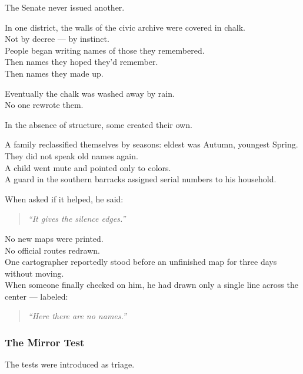 \documentclass[12pt]{article}
\begin{document}
The Senate never issued another.

\vspace{1em}

In one district, the walls of the civic archive were covered in chalk.\\
Not by decree — by instinct.\\
People began writing names of those they remembered.\\
Then names they hoped they’d remember.\\
Then names they made up.

Eventually the chalk was washed away by rain.\\
No one rewrote them.

\vspace{1em}

In the absence of structure, some created their own.

A family reclassified themselves by seasons: eldest was Autumn, youngest Spring.\\
They did not speak old names again.\\
A child went mute and pointed only to colors.\\
A guard in the southern barracks assigned serial numbers to his household.

When asked if it helped, he said:

\begin{quote}
\textit{“It gives the silence edges.”}
\end{quote}

\vspace{1em}

No new maps were printed.\\
No official routes redrawn.\\
One cartographer reportedly stood before an unfinished map for three days without moving.\\
When someone finally checked on him, he had drawn only a single line across the center — labeled:

\begin{quote}
\textit{“Here there are no names.”}
\end{quote}

\dotfill

\subsubsection{The Mirror Test}

The tests were introduced as triage.
\end{document}
